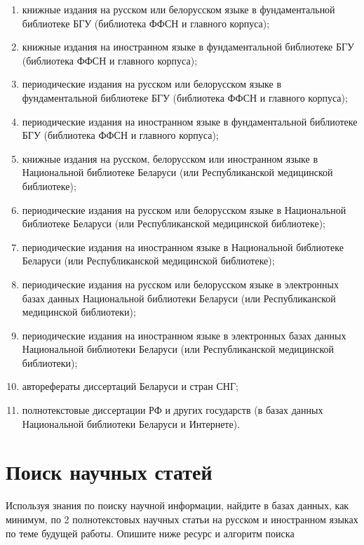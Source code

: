 \documentclass{../../common/thesisbyxetex}
\begin{document}
\begin{enumerate}
 \item книжные издания на русском или белорусском языке в фундаментальной библиотеке БГУ (библиотека ФФСН и главного
корпуса);
\item книжные издания на иностранном языке в фундаментальной библиотеке БГУ (библиотека ФФСН и главного корпуса);
\item периодические издания на русском или белорусском языке в фундаментальной библиотеке БГУ (библиотека ФФСН и
главного
корпуса);
\item периодические издания на иностранном языке в фундаментальной библиотеке БГУ (библиотека ФФСН и главного корпуса);
\item книжные издания на русском, белорусском или иностранном языке в Национальной библиотеке Беларуси (или
Республиканской медицинской библиотеке);
\item периодические издания на русском или белорусском языке в Национальной библиотеке Беларуси (или Республиканской
медицинской библиотеке);
\item периодические издания на иностранном языке в Национальной библиотеке Беларуси (или Республиканской медицинской
библиотеке);
\item периодические издания на русском или белорусском языке в электронных базах данных Национальной библиотеки Беларуси
(или Республиканской медицинской библиотеки);
\item периодические издания на иностранном языке в электронных базах данных Национальной библиотеки Беларуси (или
Республиканской медицинской библиотеки);
\item авторефераты диссертаций Беларуси и стран СНГ;
\item полнотекстовые диссертации РФ и других государств (в базах данных Национальной библиотеки Беларуси и Интернете).

\end{enumerate}

\section*{Поиск научных статей}

Используя знания по поиску научной информации, найдите в базах данных, как минимум, по 2 полнотекстовых научных статьи
на русском и иностранном языках по теме будущей работы. Опишите ниже ресурс и алгоритм поиска
\end{document}
